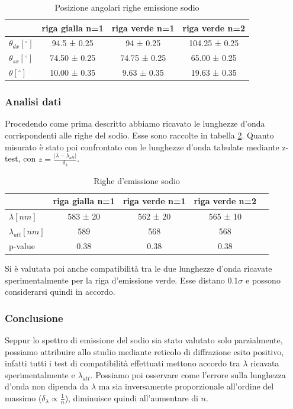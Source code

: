 \documentclass[a4paper]{article}
\begin{document}
\begin{table}[htbp]
\centering
\begin{tabular}{|l|c|c|c|}
\hline
 & riga gialla n=1 & riga verde n=1 & riga verde n=2 \\\hline
$\theta_{dx} [^\circ] $ & 94.5 ± 0.25 & 94 ± 0.25 & 104.25 ± 0.25  \\\hline
$\theta_{sx} [^\circ]$ &74.50 ± 0.25 & 74.75 ± 0.25 & 65.00 ± 0.25 \\\hline
$\theta [^\circ]$ &  10.00 ± 0.35 & 9.63 ± 0.35 & 19.63 ± 0.35 \\\hline
\end{tabular}
\caption{Posizione angolari righe emissione sodio}
\label{tab:angoli.sodio}
\end{table}

\subsubsection{Analisi dati}
Procedendo come prima descritto abbiamo ricavato le lunghezze d'onda corrispondenti alle righe del sodio. Esse sono raccolte in tabella \ref{tab:lunghezza_d'onda.sodio}. Quanto misurato è stato poi confrontato con le lunghezze d'onda tabulate mediante z-test, con $z=\frac{|\lambda-\lambda_{att}|}{\delta_{\lambda}}$.

\begin{table}[htbp]
\centering
\begin{tabular}{|l|c|c|c|c|}
\hline
 & riga gialla n=1 & riga verde n=1 & riga verde n=2  \\\hline
$\lambda [nm] $ & 583 ± 20 & 562 ± 20 & 565 ± 10 \\\hline
$\lambda_{att} [nm]$ & 589 & 568 & 568 \\\hline
p-value & 0.38 & 0.38 & 0.38 \\\hline
\end{tabular}
\caption{Righe d'emissione sodio}
\label{tab:lunghezza_d'onda.sodio}
\end{table}

Si è valutata poi anche compatibilità tra le due lunghezze d'onda ricavate sperimentalmente per la riga d'emissione verde. Esse distano $0.1\sigma$ e possono considerarsi quindi in accordo.

\subsubsection{Conclusione}
Seppur lo spettro di emissione del sodio sia stato valutato solo parzialmente, possiamo attribuire allo studio mediante reticolo di diffrazione esito positivo, infatti tutti i test di compatibilità effettuati mettono accordo tra $\lambda$ ricavata sperimentalmente e $\lambda_{att}$. Possiamo poi osservare come l'errore sulla lunghezza d'onda non dipenda da $\lambda$ ma sia inversamente proporzionale all'ordine del massimo ($\delta_{\lambda} \propto \frac{1}{n}$), diminuisce quindi all'aumentare di $n$. 
\end{document}
